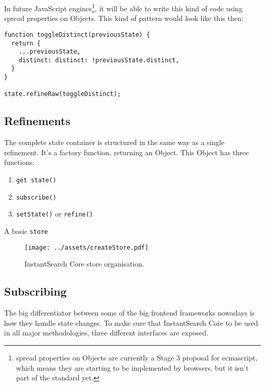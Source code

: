 In future JavaScript engines\footnote{spread properties on Objects are currently a Stage 3 proposal for \acrshort{ecmascript}\cite{es-prop-spread}, which means they are starting to be implemented by browsers, but it isn't part of the standard yet.}, it will be able to write this kind of code using spread properties on Objects. This kind of pattern would look like this then:

\begin{minipage}{\linewidth}
\begin{lstlisting}[caption={Toggling the {\tt DISTINCT} parameter when Object spread is available},label={lst:is-core-raw-es2015}]
function toggleDistinct(previousState) {
  return {
    ...previousState,
    distinct: distinct: !previousState.distinct,
  }
}

state.refineRaw(toggleDistinct);
\end{lstlisting}
\end{minipage}

\subsection{Refinements}
\label{ssec:refinments}

The complete state container is structured in the same way as a single refinement. It's a factory function, returning an Object. This Object has three functions: 

\begin{enumerate}
  \item {\tt get state()}
  \item {\tt subscribe()}
  \item {\tt setState()} or {\tt refine()}
\end{enumerate}

A basic {\tt store}

\begin{figure}[H]
  \centering
  \texttt{[image: ../assets/createStore.pdf]}
  \caption{InstantSearch Core store organisation.}
  \label{figure:createstore_inheritance}
\end{figure}

\subsection{Subscribing}
\label{ssec:Subscribing}

The big differentiator between some of the big frontend frameworks nowadays is how they handle state changes. To make sure that InstantSearch Core to be used in all major methodologies, three different interfaces are exposed.

